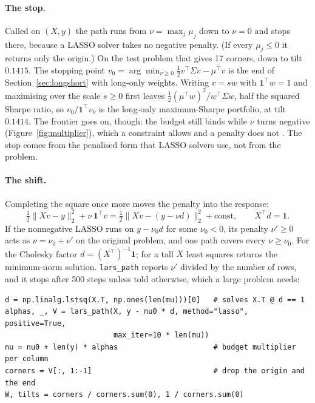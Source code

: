 \documentclass[11pt]{article}
\newcommand{\trans}{^{\top}}
\newcommand{\Sig}{\Sigma}
\begin{document}
\paragraph{The stop.} Called on $(X,y)$ the path runs from $\nu=\max_j\mu_j$ down to
$\nu=0$ and stops there, because a LASSO solver takes no negative penalty. (If every
$\mu_j\le0$ it returns only the origin.) On the test problem that gives 17 corners, down
to tilt $0.1415$. The stopping point
$v_0=\arg\min_{v\ge0}\frac12v\trans\Sig v-\mu\trans v$ is the end of
Section~\ref{sec:longshort} with long-only weights. Writing $v=sw$ with
$\mathbf 1\trans w=1$ and maximising over the scale $s\ge0$ first leaves
$\frac12(\mu\trans w)^2/w\trans\Sig w$, half the squared Sharpe ratio, so
$v_0/\mathbf 1\trans v_0$ is the long-only maximum-Sharpe portfolio, at tilt $0.1414$.
The frontier goes on, though: the budget still binds while $\nu$ turns negative
(Figure~\ref{fig:multiplier}), which a constraint allows and a penalty does not
\cite[\S3.4]{perspective}. The stop comes from the penalised form that LASSO solvers use, not from the problem.

\paragraph{The shift.} Completing the square once more moves the penalty into the
response:
\begin{equation}
\label{eq:shift}
\tfrac12\|Xv-y\|_2^2+\nu\,\mathbf 1\trans v
=\tfrac12\bigl\|Xv-(y-\nu d)\bigr\|_2^2+\text{const},
\qquad X\trans d=\mathbf 1 .
\end{equation}
If the nonnegative LASSO runs on $y-\nu_0d$ for some $\nu_0<0$, its penalty $\nu'\ge0$
acts as $\nu=\nu_0+\nu'$ on the original problem, and one path covers every $\nu\ge\nu_0$.
For the Cholesky factor $d=(X\trans)^{-1}\mathbf 1$; for a tall $X$ least squares returns
the minimum-norm solution. \texttt{lars\_path} reports $\nu'$ divided by the number of
rows, and it stops after 500 steps unless told otherwise, which a large problem needs:

\begin{lstlisting}
d = np.linalg.lstsq(X.T, np.ones(len(mu)))[0]   # solves X.T @ d == 1
alphas, _, V = lars_path(X, y - nu0 * d, method="lasso", positive=True,
                         max_iter=10 * len(mu))
nu = nu0 + len(y) * alphas                      # budget multiplier per column
corners = V[:, 1:-1]                            # drop the origin and the end
W, tilts = corners / corners.sum(0), 1 / corners.sum(0)
\end{lstlisting}
\end{document}
